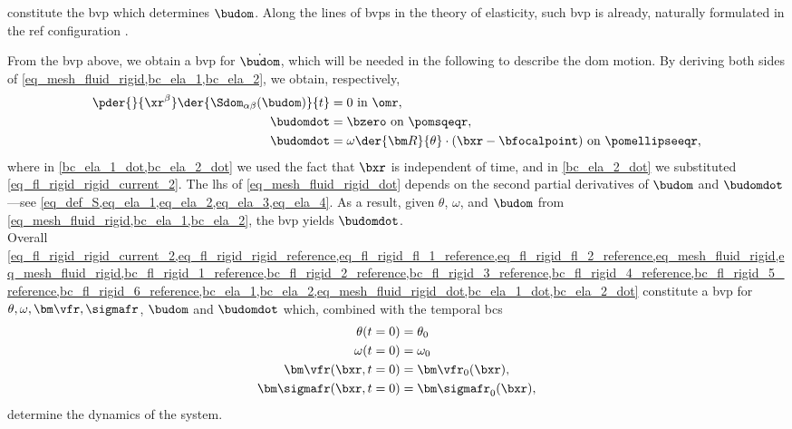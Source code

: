  constitute the \ac{bvp} which determines $\budom$. Along the lines of \acp{bvp} in the theory of elasticity, such \ac{bvp} is already, naturally formulated in the \ac{ref} configuration \cite{landauTheoryElasticity1986}.


From  the \ac{bvp} above, we obtain a \ac{bvp} for $\dot{\budom}$, which will be needed in the following to describe the \ac{dom} motion. By deriving both sides of \cref{eq_mesh_fluid_rigid,bc_ela_1,bc_ela_2}, we obtain, respectively,
\begin{align}
        \label{eq_mesh_fluid_rigid_dot}
        \pder{}{\xr^\beta}\der{\Sdom_{\alpha \beta}(\budom)}{t} & = 0 \text{ in } \omr,                                                                  \\
        \label{bc_ela_1_dot}
        \budomdot                                               & =\bzero \text{ on } \pomsqeqr,                                                         \\
        \label{bc_ela_2_dot}
        \budomdot                                               & =  \omega \der{{\bm R}}{\theta}\cdot (\bxr - \bfocalpoint) \text{ on } \pomellipseeqr,
\end{align}
where in \cref{bc_ela_1_dot,bc_ela_2_dot} we used the fact that $\bxr$ is independent of time, and in \cref{bc_ela_2_dot} we substituted \cref{eq_fl_rigid_rigid_current_2}. The \ac{lhs} of \cref{eq_mesh_fluid_rigid_dot} depends on the second partial derivatives of $\budom$ and $\budomdot$---see \cref{eq_def_S,eq_ela_1,eq_ela_2,eq_ela_3,eq_ela_4}. As a result, given $\theta$, $\omega$, and $\budom$ from \cref{eq_mesh_fluid_rigid,bc_ela_1,bc_ela_2}, the \ac{bvp}   yields $\budomdot$.\vspace{0.5cm}\\

Overall \cref{eq_fl_rigid_rigid_current_2,eq_fl_rigid_rigid_reference,eq_fl_rigid_fl_1_reference,eq_fl_rigid_fl_2_reference,eq_mesh_fluid_rigid,eq_mesh_fluid_rigid,bc_fl_rigid_1_reference,bc_fl_rigid_2_reference,bc_fl_rigid_3_reference,bc_fl_rigid_4_reference,bc_fl_rigid_5_reference,bc_fl_rigid_6_reference,bc_ela_1,bc_ela_2,eq_mesh_fluid_rigid_dot,bc_ela_1_dot,bc_ela_2_dot}
constitute a \ac{bvp} for $\theta, \omega, {\bm \vfr}, \sigmafr$, $\budom$ and $\budomdot$ which, combined with the temporal \acp{bc}
\begin{align}
        \theta(t=0)               & = \theta_0                \\
        \omega(t=0)               & = \omega_0                \\
        {\bm \vfr}(\bxr, t=0)     & = {\bm \vfr}_0(\bxr),     \\
        {\bm \sigmafr}(\bxr, t=0) & = {\bm \sigmafr}_0(\bxr),
\end{align}
determine the dynamics of the system.


